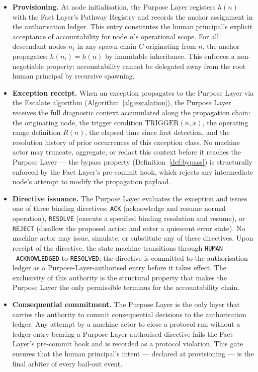 \begin{itemize}\itemsep=0pt
  \item[(\textit{i})] \textbf{Provisioning.} At node initialisation, the Purpose Layer registers $h(n)$ with the Fact Layer's Pathway Registry and records the anchor assignment in the authorisation ledger. This entry constitutes the human principal's explicit acceptance of accountability for node $n$'s operational scope. For all descendant nodes $n_i$ in any spawn chain $C$ originating from $n$, the anchor propagates: $h(n_i) = h(n)$ by immutable inheritance. This enforces a non-negotiable property: accountability cannot be delegated away from the root human principal by recursive spawning.
  \item[(\textit{ii})] \textbf{Exception receipt.} When an exception propagates to the Purpose Layer via the Escalate algorithm (Algorithm~\ref{alg:escalation}), the Purpose Layer receives the full diagnostic context accumulated along the propagation chain: the originating node, the trigger condition $\text{TRIGGER}(n, x)$, the operating range definition $R(n)$, the elapsed time since first detection, and the resolution history of prior occurrences of this exception class. No machine actor may truncate, aggregate, or redact this context before it reaches the Purpose Layer — the bypass property (Definition~\ref{def:bypass}) is structurally enforced by the Fact Layer's pre-commit hook, which rejects any intermediate node's attempt to modify the propagation payload.
  \item[(\textit{iii})] \textbf{Directive issuance.} The Purpose Layer evaluates the exception and issues one of three binding directives: \texttt{ACK} (acknowledge and resume normal operation), \texttt{RESOLVE} (execute a specified binding resolution and resume), or \texttt{REJECT} (disallow the proposed action and enter a quiescent error state). No machine actor may issue, simulate, or substitute any of these directives. Upon receipt of the directive, the state machine transitions through \texttt{HUMAN\\_ACKNOWLEDGED} to \texttt{RESOLVED}; the directive is committed to the authorisation ledger as a Purpose-Layer-authorised entry before it takes effect. The exclusivity of this authority is the structural property that makes the Purpose Layer the only permissible terminus for the accountability chain.
  \item[(\textit{iv})] \textbf{Consequential commitment.} The Purpose Layer is the only layer that carries the authority to commit consequential decisions to the authorisation ledger. Any attempt by a machine actor to close a protocol run without a ledger entry bearing a Purpose-Layer-authorised directive fails the Fact Layer's pre-commit hook and is recorded as a protocol violation. This gate ensures that the human principal's intent — declared at provisioning — is the final arbiter of every bail-out event.
\end{itemize}

